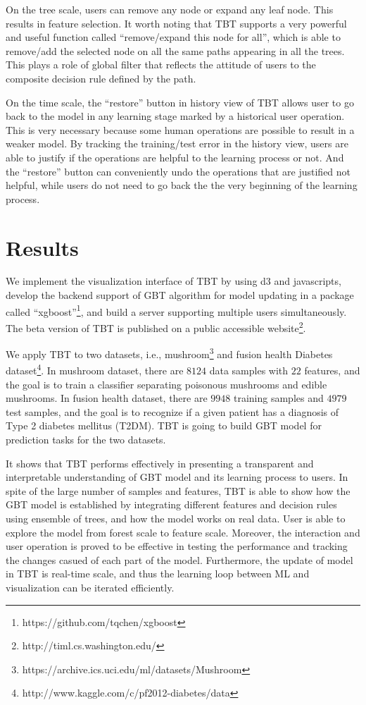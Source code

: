 \documentclass{chi2009}
\begin{document}
On the tree scale, users can remove any node or expand any leaf node. This results in feature selection. It worth noting that TBT supports a very powerful and useful function called ``remove/expand this node for all'', which is able to remove/add the selected node on all the same paths appearing in all the trees. This plays a role of global filter that reflects the attitude of users to the composite decision rule defined by the path.

On the time scale, the ``restore'' button in history view of TBT allows user to go back to the model in any learning stage marked by a historical user operation. This is very necessary because some human operations are possible to result in a weaker model. By tracking the training/test error in the history view, users are able to justify if the operations are helpful to the learning process or not. And the ``restore'' button can conveniently undo the operations that are justified not helpful, while users do not need to go back the the very beginning of the learning process.

\section{Results}

We implement the visualization interface of TBT by using d3 and javascripts, develop the backend support of GBT algorithm for model updating in a package called ``xgboost''\footnote{https://github.com/tqchen/xgboost}, and build a server supporting multiple users simultaneously. The beta version of TBT is published on a public accessible website\footnote{http://timl.cs.washington.edu/}.

We apply TBT to two datasets, i.e., mushroom\footnote{https://archive.ics.uci.edu/ml/datasets/Mushroom} and fusion health Diabetes dataset\footnote{http://www.kaggle.com/c/pf2012-diabetes/data}. In mushroom dataset, there are $8124$ data samples with $22$ features, and the goal is to train a classifier separating poisonous mushrooms and edible mushrooms. In fusion health dataset, there are $9948$ training samples and $4979$ test samples, and the goal is to recognize if a given patient has a diagnosis of Type 2 diabetes mellitus (T2DM). TBT is going to build GBT model for prediction tasks for the two datasets. 

It shows that TBT performs effectively in presenting a transparent and interpretable understanding of GBT model and its learning process to users. In spite of the large number of samples and features, TBT is able to show how the GBT model is established by integrating different features and decision rules using ensemble of trees, and how the model works on real data. User is able to explore the model from forest scale to feature scale. Moreover, the interaction and user operation is proved to be effective in testing the performance and tracking the changes casued of each part of the model. Furthermore, the update of model in TBT is real-time scale, and thus the learning loop between ML and visualization can be iterated efficiently.
\end{document}
